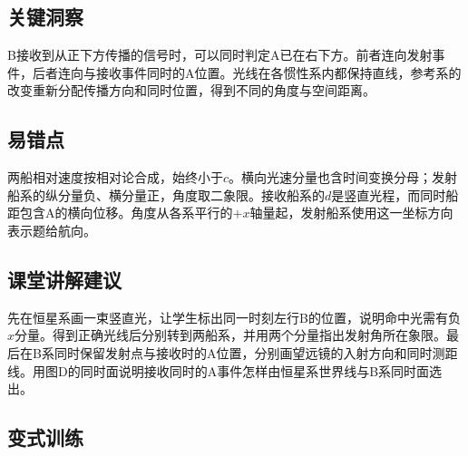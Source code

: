 \documentclass[UTF8,fontset=fandol,a4paper,11pt]{ctexart}
\begin{document}


\subsection*{关键洞察}

B接收到从正下方传播的信号时，可以同时判定A已在右下方。前者连向发射事件，后者连向与接收事件同时的A位置。光线在各惯性系内都保持直线，参考系的改变重新分配传播方向和同时位置，得到不同的角度与空间距离。



\subsection*{易错点}

两船相对速度按相对论合成，始终小于$c$。横向光速分量也含时间变换分母；发射船系的纵分量负、横分量正，角度取二象限。接收船系的$d$是竖直光程，而同时船距包含A的横向位移。角度从各系平行的$+x$轴量起，发射船系使用这一坐标方向表示题给航向。



\subsection*{课堂讲解建议}

先在恒星系画一束竖直光，让学生标出同一时刻左行B的位置，说明命中光需有负$x$分量。得到正确光线后分别转到两船系，并用两个分量指出发射角所在象限。最后在B系同时保留发射点与接收时的A位置，分别画望远镜的入射方向和同时测距线。用图D的同时面说明接收同时的A事件怎样由恒星系世界线与B系同时面选出。



\subsection*{变式训练}
\end{document}
